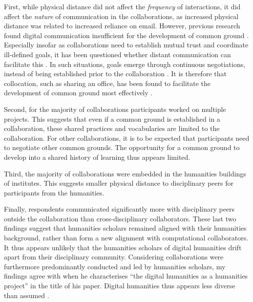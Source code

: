 \documentclass{article}
\begin{document}
First, while physical distance did not affect the \textit{frequency} of interactions, it did affect the \textit{nature} of communication in the collaborations, 
as increased physical distance was related to increased reliance on email.
However, previous research found digital communication insufficient for the development of common ground \citep{Siemens2009}.
Especially insofar as collaborations need to establish mutual trust and coordinate ill-defined goals, it has been questioned whether distant communication can facilitate this \citep{sonderegger2009}.
In such situations, goals emerge through continuous negotiations, instead of being established prior to the collaboration \citep{haythornthwaite2006}.
It is therefore that collocation, such as sharing an office, has been found to facilitate the development of common ground most effectively \citep{Olson2002}.

Second, for the majority of collaborations participants worked on multiple projects. This suggests that even if a common ground is established in a collaboration, these shared practices and vocabularies are limited to the collaboration. 
For other collaborations, it is to be expected that participants need to negotiate other common grounds. 
The opportunity for a common ground to develop into a shared history of learning thus appears limited.

Third, the majority of collaborations were embedded in the humanities buildings of institutes. This suggests smaller physical distance to disciplinary peers for participants from the humanities.

Finally, respondents communicated significantly more with disciplinary peers outside the collaboration than cross-disciplinary collaborators.
These last two findings suggest that humanities scholars remained aligned with their humanities background, rather than form a new alignment with computational collaborators. 
It thus appears unlikely that the humanities scholars of digital humanities drift apart from their disciplinary community.
Considering collaborations were furthermore predominantly conducted and led by humanities scholars, my findings agree with \citet{svensson2011} when he characterises ``the digital humanities as a humanities project'' in the title of his paper. 
Digital humanities thus appears less diverse than assumed \citep[c.f.][]{edmond2016}.
\end{document}
